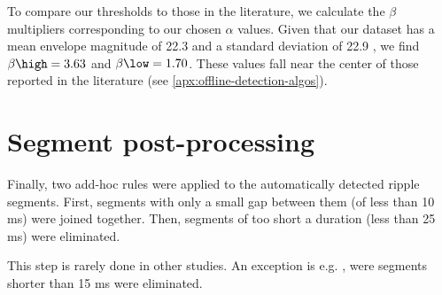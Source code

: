 
To compare our thresholds to those in the literature, we calculate the $\beta$ multipliers corresponding to our chosen $\alpha$ values. Given that our dataset has a mean envelope magnitude of 22.3 \uV{} and a standard deviation of 22.9 \uV{}, we find $\beta\high = 3.63$ and $\beta\low = 1.70$. These values fall near the center of those reported in the literature (see \cref{apx:offline-detection-algos}).



\section{Segment post-processing}

Finally, two add-hoc rules were applied to the automatically detected ripple segments. First, segments with only a small gap between them (of less than 10 ms) were joined together. Then, segments of too short a duration (less than 25 ms) were eliminated.

This step is rarely done in other studies. An exception is e.g. \cite{Dutta2018}, were segments shorter than 15 ms were eliminated.



